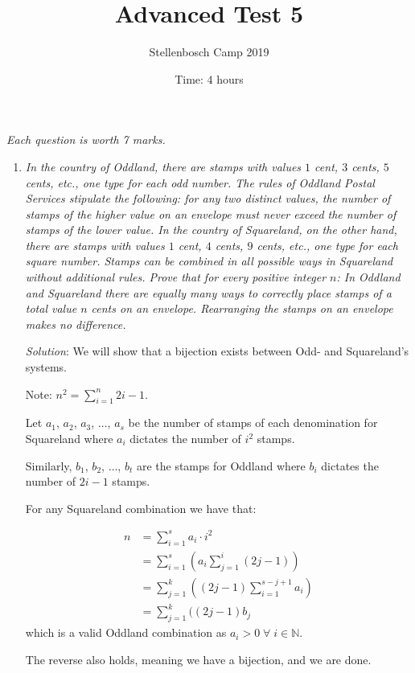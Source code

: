 \documentclass{article}
\title{Advanced Test 5}
\author{Stellenbosch Camp 2019}
\date{Time: $4$ hours}
\begin{document}
\maketitle
\thispagestyle{empty}

\hfill\textit{Each question is worth 7 marks.}

\begin{enumerate}[1.]

  \item %
  \textit{In the country of Oddland, there are stamps with values $1$ cent, $3$ cents, $5$ cents, etc., one type for each odd number.
  The rules of Oddland Postal Services stipulate the following: for any two distinct values, the number of stamps of the higher value on an envelope must never exceed the number of stamps of the lower value.
  In the country of Squareland, on the other hand, there are stamps with values $1$ cent, $4$ cents, $9$ cents, etc., one type for each square number.
  Stamps can be combined in all possible ways in Squareland without additional rules.
  Prove that for every positive integer $n$:
  In Oddland and Squareland there are equally many ways to correctly place stamps of a total value $n$ cents on an envelope.
  Rearranging the stamps on an envelope makes no difference.
  }
  
  \textit{Solution}: 
  We will show that a bijection exists between Odd- and Squareland's systems.
  
  Note: $n^2 = \sum_{i = 1}^{n}2i - 1$.
  
  Let $a_1$, $a_2$, $a_3$, $\dots$, $a_s$ be the number of stamps of each denomination for Squareland where $a_i$ dictates the number of $i^2$ stamps.
  
  Similarly, $b_1$, $b_2$, $\dots$, $b_t$ are the stamps for Oddland where $b_i$ dictates the number of $2i - 1$ stamps.
  
  For any Squareland combination we have that:
  
  \begin{align*}
    n &= \sum_ {i = 1}^{s} a_i \cdot i^2 \\
    &= \sum_ {i = 1}^{s} (a_i \sum_{j = 1}^{i} (2j - 1) ) \\
    &= \sum_ {j = 1}^{k} ((2j - 1) \sum_{i = 1}^{s - j + 1}a_i) \\
    &= \sum_ {j = 1}^{k} ((2j - 1) b_j 
  \end{align*}
  which is a valid Oddland combination as $a_i > 0 \;\forall\; i \in \mathbb{N}$.
  
  The reverse also holds, meaning we have a bijection, and we are done.
  

\end{enumerate}
\end{document}
